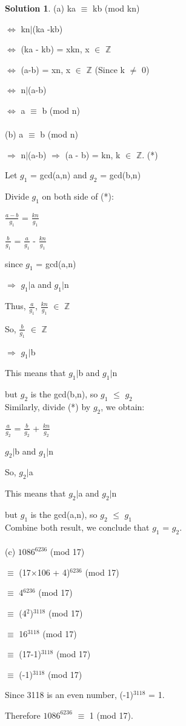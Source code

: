 \documentclass{article}
\theoremstyle{definition}
\newtheorem*{solution}{Solution}
\begin{document}
\begin{solution}
(a) ka \(\equiv\) kb (mod kn)

\(\Leftrightarrow\) kn\(|\)(ka -kb)

\(\Leftrightarrow\) (ka - kb) = xkn, x \(\in\) \(\mathbb{Z}\)

\(\Leftrightarrow\) (a-b) = xn, x \(\in\) \(\mathbb{Z}\) (Since k \(\neq\) 0)

\(\Leftrightarrow\) n\(|\)(a-b)

\(\Leftrightarrow\) a \(\equiv\) b (mod n)\\\\


(b) a \(\equiv\) b (mod n)

\(\Rightarrow\) n\(|\)(a-b) \(\Rightarrow\) (a - b) = kn, k \(\in\) \(\mathbb{Z}\). (*)

Let \(g_1\) = gcd(a,n) and \(g_2\) = gcd(b,n)

Divide \(g_1\) on both side of (*):

\(\frac{a-b}{g_1}\) = \(\frac{kn}{g_1}\)

\(\frac{b}{g_1}\) = \(\frac{a}{g_1}\) - \(\frac{kn}{g_1}\)

since \(g_1\) = gcd(a,n)

\(\Rightarrow\) \(g_1\)\(|\)a and \(g_1\)\(|\)n

Thus, \(\frac{a}{g_1}\), \(\frac{kn}{g_1}\) \(\in\) \(\mathbb{Z}\)

So, \(\frac{b}{g_1}\) \(\in\) \(\mathbb{Z}\)

\(\Rightarrow\) \(g_1\)\(|\)b

This means that \(g_1\)\(|\)b and \(g_1\)\(|\)n

but \(g_2\) is the gcd(b,n), so \(g_1\) \(\leq\) \(g_2\)\\

Similarly, divide (*) by \(g_2\), we obtain:

\(\frac{a}{g_2}\) = \(\frac{b}{g_2}\) + \(\frac{kn}{g_2}\)

\(g_2\)\(|\)b and \(g_1\)\(|\)n

So,  \(g_2\)\(|\)a

This means that \(g_2\)\(|\)a and \(g_2\)\(|\)n

but \(g_1\) is the gcd(a,n), so \(g_2\) \(\leq\) \(g_1\)\\

Combine both result, we conclude that \(g_1\) = \(g_2\).\\\\


(c) \(1086^{6236}\) (mod 17)

\(\equiv\) (17\(\times\)106 + 4)\(^{6236}\) (mod 17)

\(\equiv\) 4\(^{6236}\) (mod 17)

\(\equiv\) (4\(^{2}\))\(^{3118}\) (mod 17)

\(\equiv\) 16\(^{3118}\) (mod 17)

\(\equiv\) (17-1)\(^{3118}\) (mod 17)

\(\equiv\) (-1)\(^{3118}\) (mod 17)

Since 3118 is an even number, (-1)\(^{3118}\) = 1.

Therefore \(1086^{6236}\) \(\equiv\) 1 (mod 17).
\end{solution}
  
\end{document}
